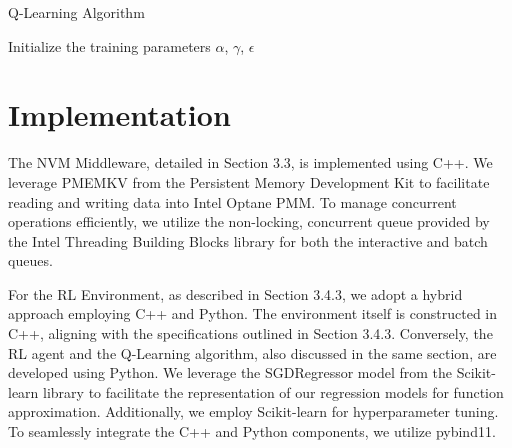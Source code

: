 \begin{algorithm}
  \caption{Q-Learning Algorithm}
  \label{algo:q_learning_mw}
  \SetAlgoLined
  Initialize the training parameters $\alpha$, $\gamma$, $\epsilon$\;
\end{algorithm}

\section{Implementation}

The NVM Middleware, detailed in Section 3.3, is implemented using C++. We leverage PMEMKV from the Persistent Memory Development Kit \cite{scargall2020pmem} to facilitate reading and writing data into Intel Optane PMM. To manage concurrent operations efficiently, we utilize the non-locking, concurrent queue provided by the Intel Threading Building Blocks \cite{tbb:online} library for both the interactive and batch queues.

For the RL Environment, as described in Section 3.4.3, we adopt a hybrid approach employing C++ and Python. The environment itself is constructed in C++, aligning with the specifications outlined in Section 3.4.3. Conversely, the RL agent and the Q-Learning algorithm, also discussed in the same section, are developed using Python. We leverage the SGDRegressor model from the Scikit-learn\cite{scikitle61:online} library to facilitate the representation of our regression models for function approximation. Additionally, we employ Scikit-learn for hyperparameter tuning. To seamlessly integrate the C++ and Python components, we utilize pybind11\cite{pybind1111:online}.